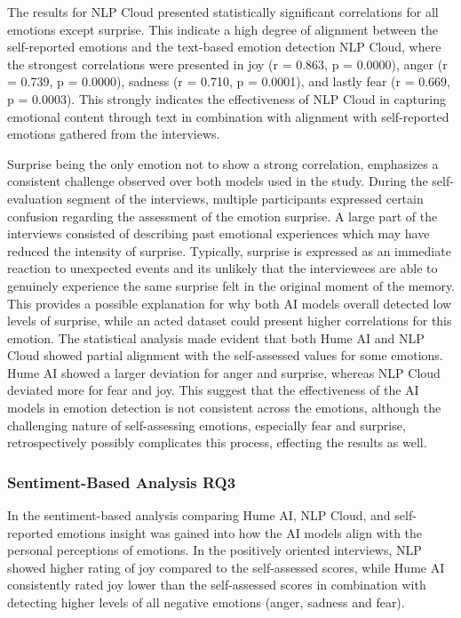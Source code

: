 The results for NLP Cloud presented statistically significant correlations for all emotions except surprise. This indicate a high degree of alignment between the self-reported emotions and the text-based emotion detection NLP Cloud, where the strongest correlations were presented in joy (r = 0.863, p = 0.0000), anger (r = 0.739, p = 0.0000), sadness (r = 0.710, p = 0.0001), and lastly fear (r = 0.669, p = 0.0003).
This strongly indicates the effectiveness of NLP Cloud in capturing emotional content through text in combination with alignment with self-reported emotions gathered from the interviews. 

Surprise being the only emotion not to show a strong correlation, emphasizes a consistent challenge observed over both models used in the study. During the self-evaluation segment of the interviews, multiple participants expressed certain confusion regarding the assessment of the emotion surprise. A large part of the interviews consisted of describing past emotional experiences which may have reduced the intensity of surprise. Typically, surprise is expressed as an immediate reaction to unexpected events and its unlikely that the interviewees are able to genuinely experience the same surprise felt in the original moment of the memory. This provides a possible explanation for why both AI models overall detected low levels of surprise, while an acted dataset could present higher correlations for this emotion.
The statistical analysis made evident that both Hume AI and NLP Cloud showed partial alignment with the self-assessed values for some emotions. Hume AI showed a larger deviation for anger and surprise, whereas NLP Cloud deviated more for fear and joy. This suggest that the effectiveness of the AI models in emotion detection is not consistent across the emotions, although the challenging nature of self-assessing emotions, especially fear and surprise, retrospectively possibly complicates this process, effecting the results as well.


\subsubsection{Sentiment-Based Analysis RQ3}
In the sentiment-based analysis comparing Hume AI, NLP Cloud, and self-reported emotions insight was gained into how the AI models align with the personal perceptions of emotions.
In the positively oriented interviews, NLP showed higher rating of joy compared to the self-assessed scores, while Hume AI consistently rated joy lower than the self-assessed scores in combination with detecting higher levels of all negative emotions (anger, sadness and fear).

